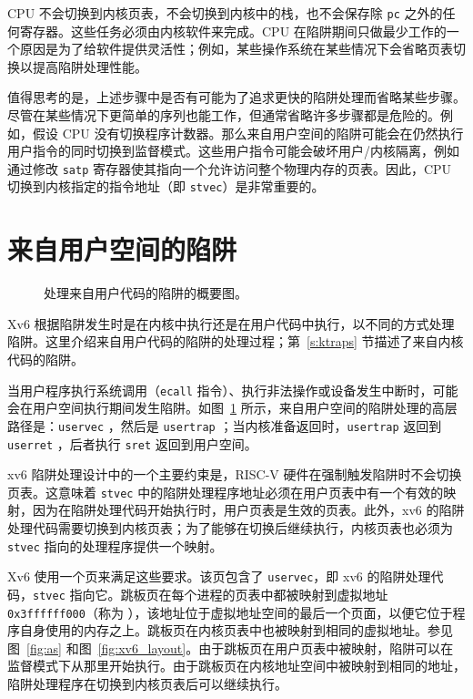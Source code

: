 CPU 不会切换到内核页表，不会切换到内核中的栈，也不会保存除 {\tt pc} 之外的任何寄存器。这些任务必须由内核软件来完成。CPU 在陷阱期间只做最少工作的一个原因是为了给软件提供灵活性；例如，某些操作系统在某些情况下会省略页表切换以提高陷阱处理性能。

值得思考的是，上述步骤中是否有可能为了追求更快的陷阱处理而省略某些步骤。尽管在某些情况下更简单的序列也能工作，但通常省略许多步骤都是危险的。例如，假设 CPU 没有切换程序计数器。那么来自用户空间的陷阱可能会在仍然执行用户指令的同时切换到监督模式。这些用户指令可能会破坏用户/内核隔离，例如通过修改 {\tt satp} 寄存器使其指向一个允许访问整个物理内存的页表。因此，CPU 切换到内核指定的指令地址（即 {\tt stvec}）是非常重要的。

\section{来自用户空间的陷阱}
\begin{figure}[t]
  \begin{center}
    
  \end{center}
\caption{处理来自用户代码的陷阱的概要图。}
\label{fig:usertrap}
\end{figure}

Xv6 根据陷阱发生时是在内核中执行还是在用户代码中执行，以不同的方式处理陷阱。这里介绍来自用户代码的陷阱的处理过程；第~\ref{s:ktraps} 节描述了来自内核代码的陷阱。

当用户程序执行系统调用（{\tt ecall} 指令）、执行非法操作或设备发生中断时，可能会在用户空间执行期间发生陷阱。如图~\ref{fig:usertrap} 所示，来自用户空间的陷阱处理的高层路径是：{\tt uservec} ，然后是 {\tt usertrap} ；当内核准备返回时，{\tt usertrap} 返回到 {\tt userret} ，后者执行 {\tt sret} 返回到用户空间。


xv6 陷阱处理设计中的一个主要约束是，RISC-V 硬件在强制触发陷阱时不会切换页表。这意味着 {\tt stvec} 中的陷阱处理程序地址必须在用户页表中有一个有效的映射，因为在陷阱处理代码开始执行时，用户页表是生效的页表。此外，xv6 的陷阱处理代码需要切换到内核页表；为了能够在切换后继续执行，内核页表也必须为 {\tt stvec} 指向的处理程序提供一个映射。

Xv6 使用一个页来满足这些要求。该页包含了 {\tt uservec}，即 xv6 的陷阱处理代码，{\tt stvec} 指向它。跳板页在每个进程的页表中都被映射到虚拟地址 {\tt 0x3ffffff000}（称为 ），该地址位于虚拟地址空间的最后一个页面，以便它位于程序自身使用的内存之上。跳板页在内核页表中也被映射到相同的虚拟地址。参见图~\ref{fig:as} 和图~\ref{fig:xv6_layout}。由于跳板页在用户页表中被映射，陷阱可以在监督模式下从那里开始执行。由于跳板页在内核地址空间中被映射到相同的地址，陷阱处理程序在切换到内核页表后可以继续执行。

